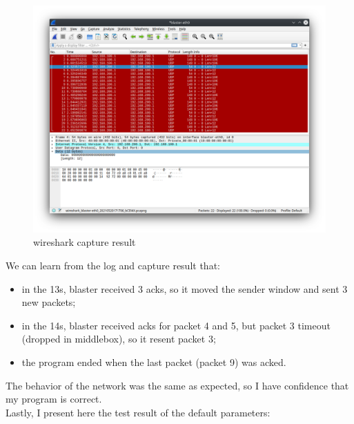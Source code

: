 \documentclass[12pt,a4paper,UTF8]{article}
\begin{document}
\begin{figure}[htbp]
	\centering
	\includegraphics[width=\textwidth]{4}
	\caption{wireshark capture result}
\end{figure}
\newpage
We can learn from the log and capture result that:
\begin{itemize}
	\item in the 13s, blaster received 3 acks, so it moved the sender window and sent 3 new packets;
	\item in the 14s, blaster received acks for packet 4 and 5, but packet 3 timeout (dropped in middlebox), so it resent packet 3;
	\item the program ended when the last packet (packet 9) was acked.
\end{itemize}
The behavior of the network was the same as expected, so I have confidence that my program is correct. \\
Lastly, I present here the test result of the default parameters:
\end{document}
